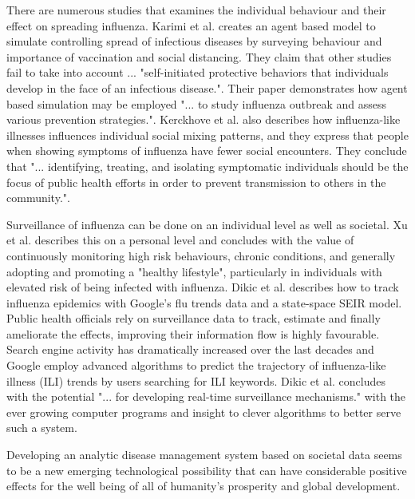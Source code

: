 There are numerous studies that examines the individual behaviour and their effect on spreading influenza. Karimi et al.\cite{karimi2015effect} creates an agent based model to simulate controlling spread of infectious diseases by surveying behaviour and importance of vaccination and social distancing. They claim that other studies fail to take into account ... "self-initiated protective behaviors that individuals develop in the face of an infectious disease.". Their paper demonstrates how agent based simulation may be employed "... to study influenza outbreak and assess various prevention strategies.". Kerckhove et al.\cite{van2013impact} also describes how influenza-like illnesses influences individual social mixing patterns, and they express that people when showing symptoms of influenza have fewer social encounters. 
They conclude that "... identifying, treating, and isolating symptomatic individuals should be the focus of public health efforts in order to prevent transmission to others in the community.".

Surveillance of influenza can be done on an individual level as well as societal. Xu et al.\cite{xu2014surveillance} describes this on a personal level and concludes with the value of continuously monitoring high risk behaviours, chronic conditions, and generally adopting and promoting a "healthy lifestyle", particularly in individuals with elevated risk of being infected with influenza. Dikic et al.\cite{dukic2012tracking} describes how to track influenza epidemics with Google's flu trends\cite{google_flu_trends} data and a state-space SEIR model. Public health officials rely on surveillance data to track, estimate and finally ameliorate the effects, improving their information flow is highly favourable. Search engine activity has dramatically increased over the last decades and Google employ advanced algorithms to predict the trajectory of influenza-like illness (ILI) trends by users searching for ILI keywords. Dikic et al. concludes with the potential "... for developing real-time surveillance mechanisms." with the ever growing computer programs and insight to clever algorithms to better serve such a system.

Developing an analytic disease management system based on societal data seems to be a new emerging technological possibility that can have considerable positive effects for the well being of all of humanity's prosperity and global development.






